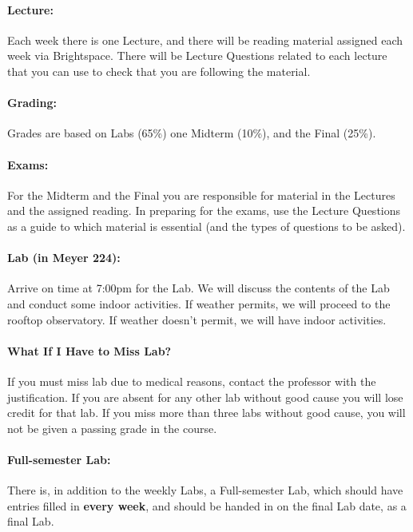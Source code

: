 \paragraph{Lecture:} Each week there is one Lecture, and
there will be reading material assigned each week via Brightspace.
There will be Lecture Questions related to each lecture that
you can use to check that you are following the material.

\paragraph{Grading:} Grades are based on Labs (65\%) 
one Midterm (10\%), and the Final (25\%).

\paragraph{Exams:} For the Midterm and the Final you are
responsible for material in the Lectures and the assigned reading.
In preparing for the exams, use the Lecture Questions as a
guide to which material is essential (and the types of
questions to be asked).

\paragraph{Lab (in Meyer 224):} Arrive on time at 7:00pm for
the Lab. We will discuss the contents of the Lab and conduct some
indoor activities. If weather permits, we will proceed to the rooftop
observatory. If weather doesn't permit, we will have indoor
activities.

\paragraph{What If I Have to Miss Lab?} If you must miss lab due
to medical reasons, contact the
professor with the justification. If you are absent for any other lab
without good cause you will lose credit for that lab. If you miss
more than three labs without good cause, you will not be given a
passing grade in the course.

\paragraph{Full-semester Lab:} There is, in addition to the weekly
Labs, a Full-semester Lab, which
should have entries filled in {\bf every week}, and should be handed
in on the final Lab date, as a final Lab.

